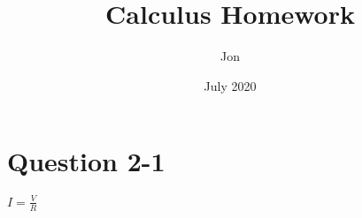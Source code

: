 \documentclass{article}
\title{Calculus Homework}
\author{Jon }
\date{July 2020}
\begin{document}
\maketitle

\section{Question 2-1}
$I=\frac{V}{R}$
\end{document}
